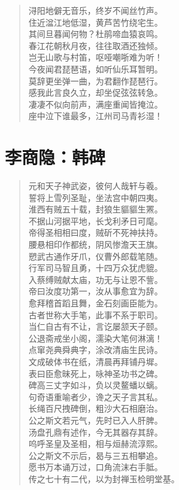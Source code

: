 \documentclass[12pt,oneside]{book}
\newenvironment{shici}{%
\begin{verse}\centering\yanti\large\hspace{12pt}}{\end{verse}}
\begin{document}
\begin{common-format}
\begin{shici}
浔阳地僻无音乐，终岁不闻丝竹声。\\
住近湓江地低湿，黄芦苦竹绕宅生。\\
其间旦暮闻何物？杜鹃啼血猿哀鸣。\\
春江花朝秋月夜，往往取酒还独倾。\\
岂无山歌与村笛，呕哑嘲哳难为听！\\
今夜闻君琵琶语，如听仙乐耳暂明。\\
莫辞更坐弹一曲，为君翻作琵琶行。\\
感我此言良久立，却坐促弦弦转急。\\
凄凄不似向前声，满座重闻皆掩泣。\\
座中泣下谁最多，江州司马青衫湿！
\end{shici}

\chapter{李商隐：韩碑}
\begin{shici}
元和天子神武姿，彼何人哉轩与羲。\\
誓将上雪列圣耻，坐法宫中朝四夷。\\
淮西有贼五十载，封狼生貙貙生罴。\\
不据山河据平地，长戈利矛日可麾。\\
帝得圣相相曰度，贼斫不死神扶持。\\
腰悬相印作都统，阴风惨澹天王旗。\\
愬武古通作牙爪，仪曹外郎载笔随。\\
行军司马智且勇，十四万众犹虎貔。\\
入蔡缚贼献太庙，功无与让恩不訾。\\
帝曰汝度功第一，汝从事愈宜为辞。\\
愈拜稽首蹈且舞，金石刻画臣能为。\\
古者世称大手笔，此事不系于职司。\\
当仁自古有不让，言讫屡颔天子颐。\\
公退斋戒坐小阁，濡染大笔何淋漓！\\
点窜尧典舜典字，涂改清庙生民诗。\\
文成破体书在纸，清晨再拜铺丹墀。\\
表曰臣愈昧死上，咏神圣功书之碑。\\
碑高三丈字如斗，负以灵鳌蟠以螭。\\
句奇语重喻者少，谗之天子言其私。\\
长绳百尺拽碑倒，粗沙大石相磨治。\\
公之斯文若元气，先时已入人肝脾。\\
汤盘孔鼎有述作，今无其器存其辞。\\
呜呼圣皇及圣相，相与烜赫流淳熙。\\
公之斯文不示后，曷与三五相攀追。\\
愿书万本诵万过，口角流沫右手胝。\\
传之七十有二代，以为封禅玉检明堂基。
\end{shici}



\end{common-format}
\end{document}
